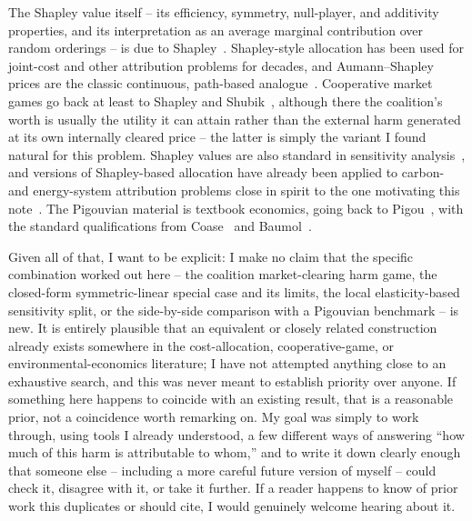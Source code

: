 \documentclass[journal, a4paper]{IEEEtran}
\begin{document}
The Shapley value itself -- its efficiency, symmetry, null-player, and additivity properties, and its interpretation as an average marginal contribution over random orderings -- is due to Shapley~\cite{Shapley1953}. Shapley-style allocation has been used for joint-cost and other attribution problems for decades, and Aumann--Shapley prices are the classic continuous, path-based analogue~\cite{AumannShapley1974,BilleraHeath1982}. Cooperative market games go back at least to Shapley and Shubik~\cite{ShapleyShubik1969}, although there the coalition's worth is usually the utility it can attain rather than the external harm generated at its own internally cleared price -- the latter is simply the variant I found natural for this problem. Shapley values are also standard in sensitivity analysis~\cite{Owen2014,SongNelsonStaum2016}, and versions of Shapley-based allocation have already been applied to carbon- and energy-system attribution problems close in spirit to the one motivating this note~\cite{XieChen2023,FengEtAl2025}. The Pigouvian material is textbook economics, going back to Pigou~\cite{Pigou1932}, with the standard qualifications from Coase~\cite{Coase1960} and Baumol~\cite{Baumol1972}.

Given all of that, I want to be explicit: I make no claim that the specific combination worked out here -- the coalition market-clearing harm game, the closed-form symmetric-linear special case and its limits, the local elasticity-based sensitivity split, or the side-by-side comparison with a Pigouvian benchmark -- is new. It is entirely plausible that an equivalent or closely related construction already exists somewhere in the cost-allocation, cooperative-game, or environmental-economics literature; I have not attempted anything close to an exhaustive search, and this was never meant to establish priority over anyone. If something here happens to coincide with an existing result, that is a reasonable prior, not a coincidence worth remarking on. My goal was simply to work through, using tools I already understood, a few different ways of answering ``how much of this harm is attributable to whom,'' and to write it down clearly enough that someone else -- including a more careful future version of myself -- could check it, disagree with it, or take it further. If a reader happens to know of prior work this duplicates or should cite, I would genuinely welcome hearing about it.
\end{document}
